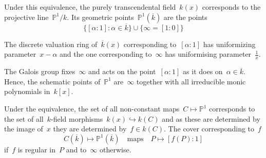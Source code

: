 \begin{example}
  Under this equivalence, the purely transcendental field~$k(x)$ corresponds to the projective line~$\mathbb{P}^1/k$. Its geometric points~$\mathbb{P}^1(\overline{k})$ are the points
  \begin{equation}
  	\{ [\alpha : 1]:\alpha \in \overline{k} \} \cup \{ \infty = [1 : 0] \}
  \end{equation}
  
  The discrete valuation ring of~$\overline{k}(x)$ corresponding to~$[\alpha : 1]$ has uniformizing parameter~$x-\alpha$ and the one corresponding to~$\infty$ has uniformising parameter~$\tfrac{1}{x}$.
  
  The Galois group fixes~$\infty$ and acts on the point~$[\alpha : 1]$ as it does on~$\alpha \in \overline{k}$. Hence, the schematic points of~$\mathbb{P}^1$ are~$\infty$ together with all irreducible monic polynomials in~$k[x]$.
  
  Under the equivalence, the set of all non-constant maps~$C \mapsto \mathbb{P}^1$ corresponds to the set of all~$k$-field morphisms~$k(x) \hookrightarrow k(C)$ and as these are determined by the image of~$x$ they are determined by~$f \in k(C)$. The cover corresponding to~$f$
  \begin{equation}
    C(\overline{k}) \mapsto \mathbb{P}^1(\overline{k}) \quad \text{maps} \quad P \mapsto [f(P) : 1]
  \end{equation}
  if~$f$ is regular in~$P$ and to~$\infty$ otherwise.
\end{example}
